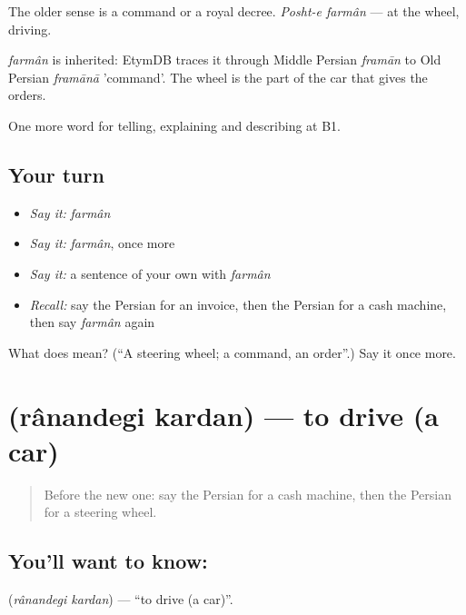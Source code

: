 The older sense is a command or a royal decree. \emph{Posht-e farmân} — at the wheel, driving.

\begin{cousinweb}
\emph{farmân} is inherited: EtymDB traces it through Middle Persian \emph{framān} to Old Persian \emph{framānā} 'command'. The wheel is the part of the car that gives the orders.
\end{cousinweb}

\begin{grammarlens}[title={What you've built}]
One more word for telling, explaining and describing at B1.
\end{grammarlens}

\subsection*{Your turn}
\begin{itemize}
\raggedright
  \item \emph{Say it:} \emph{farmân}
  \item \emph{Say it:} \emph{farmân}, once more
  \item \emph{Say it:} a sentence of your own with \emph{farmân}
  \item \emph{Recall:} say the Persian for an invoice, then the Persian for a cash machine, then say \emph{farmân} again
\end{itemize}

\begin{tcolorbox}[breakable,colback=teal!4,colframe=teal!35!black,title={Before you move on}]
What does  mean? (\textquotedblleft{}A steering wheel; a command, an order\textquotedblright{}.) Say it once more.
\end{tcolorbox}
\section[\texorpdfstring{\fa{رانندگی} \fa{کردن} (rânandegi kardan)}{رانندگی کردن (rânandegi kardan)}]{  (rânandegi kardan) — to drive (a car)}

\label{lesson:FA-C420-ranandegi-kardan}



\begin{quote}
Before the new one: say the Persian for a cash machine, then the Persian for a steering wheel.
\end{quote}

\subsection*{You'll want to know:  }
\textbf{ } (\emph{rânandegi kardan}) — \textquotedblleft{}to drive (a car)\textquotedblright{}.

